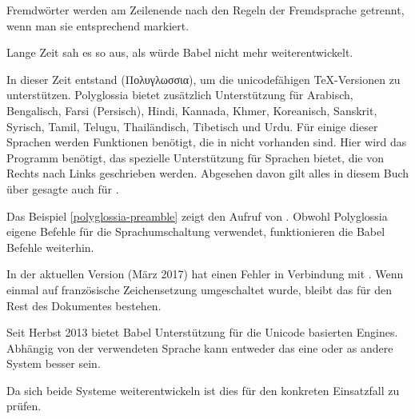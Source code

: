 Fremdwörter werden am Zeilenende nach den Regeln der Fremdsprache getrennt,
wenn man sie entsprechend markiert.

Lange Zeit sah es so aus, als würde Babel nicht mehr weiterentwickelt.

In dieser Zeit entstand  (Πολυγλωσσια), um die unicodefähigen \TeX{}-Versionen zu unterstützen.
Polyglossia bietet zusätzlich Unterstützung für Arabisch, Bengalisch, Farsi (Persisch), Hindi, Kannada, Khmer,
Koreanisch, Sanskrit, Syrisch, Tamil, Telugu, Thailändisch, Tibetisch und Urdu.
Für einige dieser Sprachen werden Funktionen benötigt, die in \LuaLaTeX{} nicht vorhanden sind.
Hier wird das Programm \XeLaTeX{} benötigt, das spezielle Unterstützung für Sprachen bietet,
die von Rechts nach Links geschrieben werden. Abgesehen davon gilt alles in diesem Buch über
\LuaLaTeX{} gesagte auch für \XeLaTeX{}.

Das Beispiel \ref{polyglossia-preamble} zeigt den Aufruf von .
Obwohl Polyglossia eigene Befehle für die Sprachumschaltung verwendet, 
funktionieren die Babel Befehle weiterhin.

In der aktuellen Version (März 2017) hat  einen Fehler in Verbindung mit \LuaLaTeX{}.
Wenn einmal auf französische Zeichensetzung umgeschaltet wurde, bleibt das für den Rest des Dokumentes bestehen.

Seit Herbst 2013 bietet Babel Unterstützung für die Unicode basierten Engines.
Abhängig von der verwendeten Sprache kann entweder das eine oder as andere System besser sein.

Da sich beide Systeme weiterentwickeln ist dies für den konkreten Einsatzfall zu prüfen.



